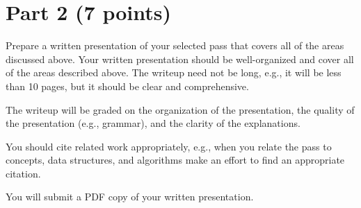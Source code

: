 \documentclass[12pt,letterpaper]{article}
\begin{document}
\section*{Part 2 (7 points)}
Prepare a written presentation of your selected pass that covers all of
the areas discussed above.  Your written presentation should be well-organized 
and cover all of the areas described above.  The writeup need not be long,
e.g., it will be less than 10 pages, but it should be clear and comprehensive.

The writeup will be graded on the organization of the presentation,
the quality of the presentation (e.g., grammar), and
the clarity of the explanations.

You should cite related
work appropriately, e.g., when you relate the pass to concepts, data
structures, and algorithms make an effort to find an appropriate citation.

You will submit a PDF copy of your written presentation.
\end{document}
